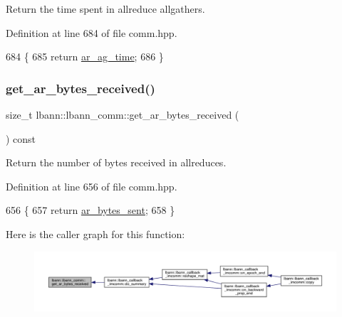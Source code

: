 Return the time spent in allreduce allgathers. 

Definition at line 684 of file comm.\+hpp.


\begin{DoxyCode}
684                                        \{
685     \textcolor{keywordflow}{return} \hyperlink{classlbann_1_1lbann__comm_a48768342eb05c1c6cdaa52c3599b93c8}{ar\_ag\_time};
686   \}
\end{DoxyCode}
\mbox{\label{classlbann_1_1lbann__comm_a1b7c53c7c8e04543e1a262a01d847976}} 
\subsubsection{\texorpdfstring{get\+\_\+ar\+\_\+bytes\+\_\+received()}{get\_ar\_bytes\_received()}}
{\footnotesize\ttfamily size\+\_\+t lbann\+::lbann\+\_\+comm\+::get\+\_\+ar\+\_\+bytes\+\_\+received (\begin{DoxyParamCaption}{ }\end{DoxyParamCaption}) const\hspace{0.3cm}{\ttfamily [inline]}}

Return the number of bytes received in allreduces. 

Definition at line 656 of file comm.\+hpp.


\begin{DoxyCode}
656                                               \{
657     \textcolor{keywordflow}{return} \hyperlink{classlbann_1_1lbann__comm_aa520c16eafde742b70daf60866afc6a8}{ar\_bytes\_sent};
658   \}
\end{DoxyCode}
Here is the caller graph for this function\+:\nopagebreak
\begin{figure}[H]
\begin{center}
\leavevmode
\includegraphics[width=350pt]{classlbann_1_1lbann__comm_a1b7c53c7c8e04543e1a262a01d847976_icgraph}
\end{center}
\end{figure}
\mbox{\label{classlbann_1_1lbann__comm_ae0be48a03e4e8af43929c97a31a8f361}} 
